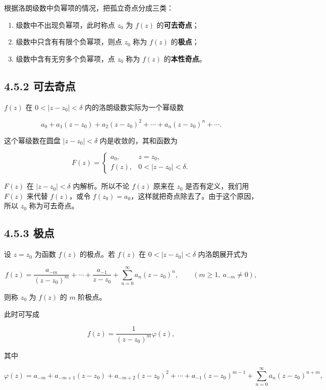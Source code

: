 根据洛朗级数中负幂项的情况，把孤立奇点分成三类：

\begin{enumerate}
\def\labelenumi{\arabic{enumi}.}
\tightlist
\item
  级数中不出现负幂项，此时称点 \(z_0\) 为 \(f(z)\) 的\textbf{可去奇点}；
\item
  级数中只含有有限个负幂项，则点 \(z_0\) 称为 \(f(z)\) 的\textbf{极点}；
\item
  级数中含有无穷多个负幂项，点 \(z_0\) 称为 \(f(z)\)
  的\textbf{本性奇点}。
\end{enumerate}

\subsection{4.5.2 可去奇点}\label{ux53efux53bbux5947ux70b9}

\(f(z)\) 在 \(0<|z-z_0|<\delta\) 内的洛朗级数实际为一个幂级数

\[
a_0+a_1(z-z_0)+a_2(z-z_0)^2+\cdots+a_n(z-z_0)^n+\cdots .
\]

这个幂级数在圆盘 \(|z-z_0|<\delta\) 内是收敛的，其和函数为

\[
F(z)=
\begin{cases}
a_0, & z=z_0,\\[4pt]
f(z), & 0<|z-z_0|<\delta .
\end{cases}
\]

\(F(z)\) 在 \(|z-z_0|<\delta\) 内解析。所以不论 \(f(z)\) 原来在 \(z_0\)
是否有定义，我们用 \(F(z)\) 来代替 \(f(z)\)，或令
\(f(z_0)=a_0\)，这样就把奇点除去了。由于这个原因，所以 \(z_0\)
称为可去奇点。

\subsection{4.5.3 极点}\label{ux6781ux70b9}

设 \(z=z_0\) 为函数 \(f(z)\) 的极点。若 \(f(z)\) 在 \(0<|z-z_0|<\delta\)
内洛朗展开式为

\[
f(z)=\frac{a_{-m}}{(z-z_0)^m}+\cdots+\frac{a_{-1}}{z-z_0}+\sum_{n=0}^{\infty}a_n(z-z_0)^n,\qquad(m\ge 1,\ a_{-m}\neq 0),
\]

则称 \(z_0\) 为 \(f(z)\) 的 \(m\) 阶极点。

此时可写成

\[
f(z)=\frac{1}{(z-z_0)^m}\varphi(z),
\]

其中

\[
\varphi(z)=a_{-m}+a_{-m+1}(z-z_0)+a_{-m+2}(z-z_0)^2+\cdots+a_{-1}(z-z_0)^{m-1}+\sum_{n=0}^{\infty}a_n(z-z_0)^{n+m},
\]

